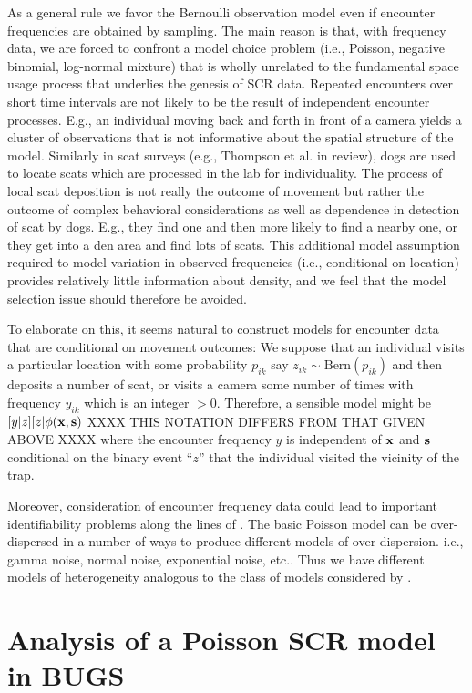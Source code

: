 As a general rule we favor the Bernoulli observation model even if
encounter frequencies are obtained by sampling.  The main reason is
that, with frequency data, we are forced to confront a model choice
problem (i.e., Poisson, negative binomial, log-normal mixture) that is
wholly unrelated to the fundamental space usage process that underlies
the genesis of SCR data. Repeated encounters over short time intervals
are not likely to be the result of independent encounter
processes. E.g., an individual moving back and forth in front of a
camera yields a cluster of observations that is not informative about
the spatial structure of the model. Similarly in scat surveys (e.g.,
Thompson et al. in review), dogs are used to locate scats which are
processed in the lab for individuality.  The process of local scat
deposition is not really the outcome of movement but rather the
outcome of complex behavioral considerations as well as dependence in
detection of scat by dogs. E.g., they find one and then more likely to
find a nearby one, or they get into a den area and find lots of scats.
This additional model assumption required to model variation in
observed frequencies (i.e., conditional on location) provides
relatively little information about density, and we feel that the
model selection issue should therefore be avoided.

To elaborate on this, it seems natural to construct models for
encounter data that are conditional on movement outcomes: We suppose
that an individual visits a particular location with some probability
$p_{ik}$ say $z_{ik}\sim  \mbox{Bern}(p_{ik})$ and then deposits a 
number of scat, or visits a camera some number of times with frequency 
$y_{ik}$ which is 
an integer $> 0$. Therefore, a sensible model might be
$[y|z][z|\phi({\bf x},{\bf s})$
XXXX THIS NOTATION DIFFERS FROM THAT GIVEN ABOVE XXXX
where the encounter frequency $y$ is independent of ${\bf x}$ and
${\bf s}$ conditional
on the binary event ``$z$'' that the individual visited the vicinity of
the trap.

Moreover, consideration of encounter frequency data could lead to
important identifiability problems along the lines of \citet{link:2003}. The
basic Poisson model can be over-dispersed in a number of ways to
produce different models of over-dispersion.  i.e., gamma noise,
normal noise, exponential noise, etc..  Thus we have different models
of heterogeneity analogous to the class of models considered by \citet{link:2003}.


\section{Analysis of a Poisson SCR model in BUGS}

